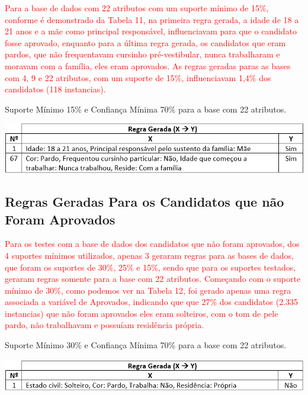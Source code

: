 \par
\textcolor{red}{Para a base de dados com 22 atributos com um suporte mínimo de 15\%, conforme é demonstrado da Tabela 11, na primeira regra gerada, a idade de 18 a 21 anos e a mãe como principal responsável, influenciavam para que o candidato fosse aprovado, enquanto para a última regra gerada, os candidatos que eram pardos, que não frequentavam cursinho pré-vestibular, nunca trabalharam e moravam com a família, eles eram aprovados. As regras geradas paras as bases com 4, 9 e 22 atributos, com um suporte de 15\%, influenciavam 1,4\% dos candidatos (118 instancias).}

\par
\begin{table}[!htp]
	\begin{center}
    \caption{\label{fig:waveform_fig} Suporte Mínimo 15\% e Confiança Mínima 70\% para a base com 22 atributos.}
	\includegraphics[scale=0.75]{Figuras/Suporte_15_atributos_22.png}
	\end{center}
\end{table}



\subsection{Regras Geradas Para os Candidatos que não Foram Aprovados}


\par
\textcolor{red}{Para os testes com a base de dados dos candidatos que não foram aprovados, dos 4 suportes mínimos utilizados, apenas 3 geraram regras para as bases de dados, que foram os suportes de 30\%, 25\% e 15\%, sendo que para os suportes testados, geraram regras somente para a base com 22 atributos. Começando com o suporte mínimo de 30\%, como podemos ver na Tabela 12, foi gerado apenas uma regra associada a variável de Aprovados, indicando que que 27\% dos candidatos (2.335 instancias) que não foram aprovados eles eram solteiros, com o tom de pele pardo, não trabalhavam e possuíam residência própria.}


\par
\begin{table}[!htp]
	\begin{center}
    \caption{\label{fig:waveform_fig} Suporte Mínimo 30\% e Confiança Mínima 70\% para a base com 22 atributos.}
	\includegraphics[scale=0.75]{Figuras/Suporte_30_Nao_atributos_22.png}
	\end{center}
\end{table}

